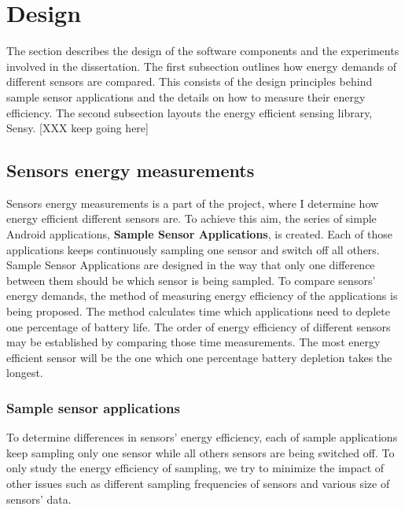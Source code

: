 \section{Design}
\label{s:design}
The section describes the design of the software components and the experiments involved in the dissertation. The first subsection outlines how energy demands of different sensors are compared. This consists of the design principles behind sample sensor applications and the details on how to measure their energy efficiency. The second subsection layouts the energy efficient sensing library, Sensy. [XXX keep going here]

\subsection{Sensors energy measurements}
\label{s:design:measurements}
Sensors energy measurements is a part of the project, where I determine how energy efficient different sensors are. To achieve this aim, the series of simple Android applications, \textbf{Sample Sensor Applications},  is created. Each of those applications keeps continuously sampling one sensor and switch off all others. Sample Sensor Applications are designed in the way that only one difference between them should be which sensor is being sampled. To compare sensors' energy demands, the method of measuring energy efficiency of the applications is being proposed. The method calculates time which applications need to deplete one percentage of battery life. The order of energy efficiency of different sensors may be established by comparing those time measurements. The most energy efficient sensor will be the one which one percentage battery depletion takes the longest. 

\subsubsection{Sample sensor applications}
\label{s:design:measurements:sampleapps}
To determine differences in sensors' energy efficiency, each of sample applications keep sampling only one sensor while all others sensors are being switched off. To only study the energy efficiency of sampling, we try to minimize the impact of other issues such as different sampling frequencies of sensors and various size of sensors' data.

